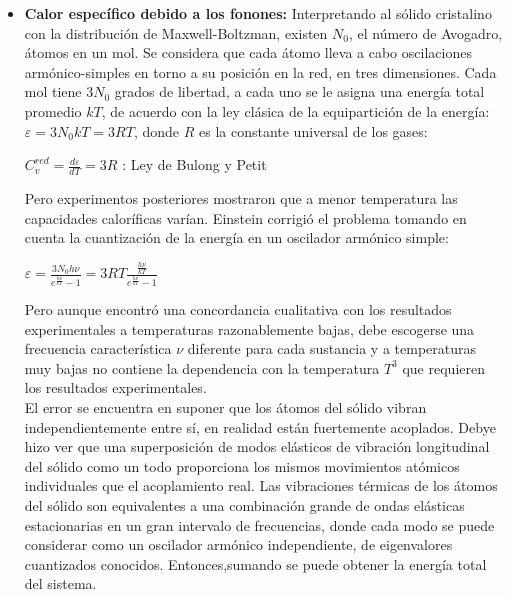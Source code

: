 \documentclass[oneside]{book}
\numberwithin{equation}{section}
\numberwithin{figure}{section}
\numberwithin{table}{section}
\begin{document}
			\begin{itemize}
				\item \textbf{Calor específico debido a los fonones:} Interpretando al sólido cristalino con la distribución de Maxwell-Boltzman, existen $N_0$, el número de Avogadro, átomos en un mol. Se considera que cada átomo lleva a cabo oscilaciones armónico-simples en torno a su posición en la red, en tres dimensiones. Cada mol tiene $3N_0$ grados de libertad, a cada uno se le asigna una energía total promedio $kT$, de acuerdo con la ley clásica de la equipartición de la energía:   $\varepsilon=3 N_0 kT=3RT$, donde $R$ es la constante universal de los gases:
			
				\begin{center}
					$\displaystyle C_v^{red}=\frac{d\varepsilon}{dT}=3R$ : Ley de Bulong y Petit
				\end{center}		
		
				Pero experimentos posteriores mostraron que a menor temperatura las capacidades caloríficas varían. Einstein corrigió el problema tomando en cuenta la cuantización de la energía en un oscilador armónico simple:
			
				\begin{center}
					$\displaystyle \varepsilon=\frac{3N_0 h \nu}{e^{\frac{h \nu}{kT}}-1}=3RT\frac{\frac{h \nu}{kT}}{e^{\frac{h \nu}{kT}}-1}$
				\end{center}
		
				Pero aunque encontró una concordancia cualitativa con los resultados experimentales a temperaturas razonablemente bajas, debe escogerse una frecuencia característica $\nu$ diferente para cada sustancia y a temperaturas muy bajas no contiene la dependencia con la temperatura $T^3$ que requieren los resultados experimentales.\\
			
				El error se encuentra en suponer que los átomos del sólido vibran independientemente entre sí, en realidad están fuertemente acoplados. Debye hizo ver que una superposición de modos elásticos de vibración longitudinal del sólido como un todo proporciona los mismos movimientos atómicos individuales que el acoplamiento real. Las vibraciones térmicas de los átomos del sólido son equivalentes a una combinación grande de ondas elásticas estacionarias en un gran intervalo de frecuencias, donde cada modo se puede considerar como un oscilador armónico independiente, de eigenvalores cuantizados conocidos. Entonces,sumando se puede obtener la energía total del sistema.\\
			

\end{itemize}
\end{document}
